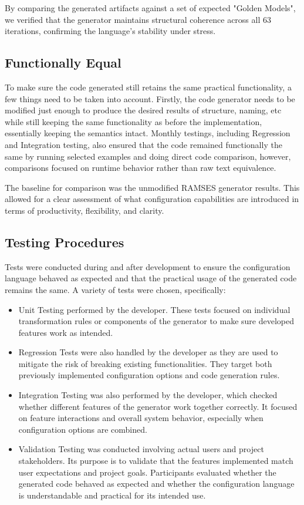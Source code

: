 By comparing the generated artifacts against a set of expected "Golden Models", we verified that the generator maintains structural coherence across all 63 iterations, confirming the language's stability under stress.

\subsection{Functionally Equal}

To make sure the code generated still retains the same practical functionality, a few things need to be taken into account. Firstly, the code generator needs to be modified just enough to produce the desired results of structure, naming, etc while still keeping the same functionality as before the implementation, essentially keeping the semantics intact. Monthly testings, including Regression and Integration testing, also ensured that the code remained functionally the same by running selected examples and doing direct code comparison, however, comparisons focused on runtime behavior rather than raw text equivalence.

The baseline for comparison was the unmodified \gls{RAMSES} generator results. This allowed for a clear assessment of what configuration capabilities are introduced in terms of productivity, flexibility, and clarity. 

\subsection{Testing Procedures}

Tests were conducted during and after development to ensure the configuration language behaved as expected and that the practical usage of the generated code remains the same. A variety of tests were chosen, specifically:

\begin{itemize}
	\item Unit Testing performed by the developer. These tests focused on individual transformation rules or components of the generator to make sure developed features work as intended.
	\item Regression Tests were also handled by the developer as they are used to mitigate the risk of breaking existing functionalities. They target both previously implemented configuration options and code generation rules.
	\item Integration Testing was also performed by the developer, which checked whether different features of the generator work together correctly. It focused on feature interactions and overall system behavior, especially when configuration options are combined.
	\item Validation Testing was conducted involving actual users and project stakeholders. Its purpose is to validate that the features implemented match user expectations and project goals. Participants evaluated whether the generated code behaved as expected and whether the configuration language is understandable and practical for its intended use.
\end{itemize}

